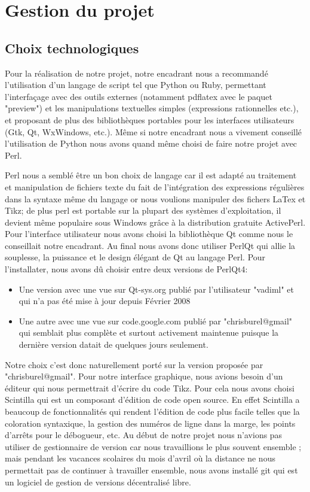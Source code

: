 \documentclass[a4paper]{report}
\begin{document}
  \section {Gestion du projet}
  \subsection{Choix technologiques}
  Pour la réalisation de notre projet, notre encadrant nous a recommandé l'utilisation d'un langage de script tel que Python ou Ruby, permettant l'interfaçage avec des outils externes (notamment pdflatex avec le paquet "preview") et les manipulations textuelles simples (expressions rationnelles etc.), et proposant de plus des bibliothèques portables pour les interfaces utilisateurs (Gtk, Qt, WxWindows, etc.). Même si notre encadrant nous a vivement conseillé l'utilisation de Python nous avons quand même choisi de faire notre projet avec Perl. 

Perl nous a semblé être un bon choix de langage car il est adapté au traitement et manipulation de fichiers texte du fait de l'intégration des expressions régulières dans la syntaxe même du langage or nous voulions manipuler des fichers LaTex et Tikz; de plus perl est portable sur la plupart des systèmes d'exploitation, il devient même populaire sous Windows grâce à la distribution gratuite ActivePerl. 
Pour l'interface utilisateur nous avons choisi la bibliothèque Qt comme nous le conseillait notre encadrant. Au final nous avons donc utiliser PerlQt qui allie la souplesse, la puissance et le design élégant de Qt au langage Perl. Pour l'installater, nous avons dû choisir entre deux versions de PerlQt4:
\begin{itemize}
 \item Une version avec une vue sur Qt-sys.org publié par l'utilisateur "vadiml" et qui n'a pas été mise à jour depuis Février 2008
 \item Une autre avec une vue sur code.google.com publié par "chrisburel@gmail" qui semblait plus complète et surtout activement maintenue puisque la dernière version datait de quelques jours seulement.
\end{itemize}
  Notre choix c'est donc naturellement porté sur la version proposée par "chrisburel@gmail".
  \newline 
  Pour notre interface graphique, nous avions besoin d'un éditeur qui nous permettrait d'écrire du code Tikz. Pour cela nous avons choisi Scintilla qui est un composant d'édition de code open source. En effet Scintilla a beaucoup de fonctionnalités qui rendent l'édition de code plus facile telles que la coloration syntaxique, la gestion des numéros de ligne dans la marge, les points d'arrêts pour le débogueur, etc.
  \newline
  Au début de notre projet nous n'avions pas utiliser de gestionnaire de version car nous travaillions le plus souvent ensemble ; mais pendant les vacances scolaires du mois d'avril où la distance ne nous permettait pas de continuer à travailler ensemble, nous avons installé git qui est un logiciel de gestion de versions décentralisé libre. 
\end{document}
